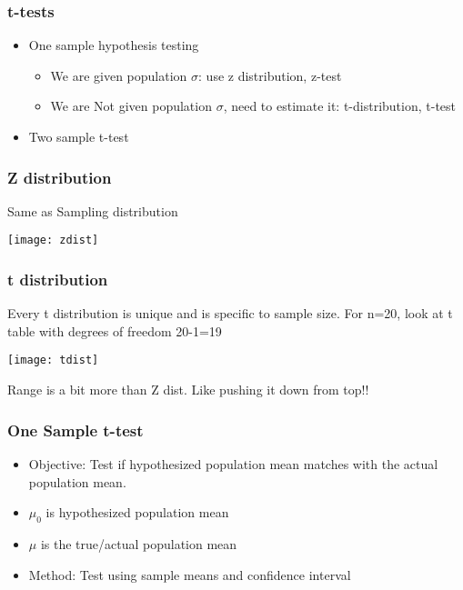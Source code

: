 \begin{frame}[fragile]\frametitle{t-tests}
\begin{itemize}
\item One sample hypothesis testing
\begin{itemize}
\item We are given population $\sigma$: use z distribution, z-test
\item We are Not given population $\sigma$, need to estimate it: t-distribution, t-test
\end{itemize}
\item Two sample t-test 
\end{itemize}
\end{frame}

\begin{frame}
\frametitle{Z distribution}
Same as Sampling distribution
\begin{center}
\texttt{[image: zdist]}
\end{center}
\end{frame}

\begin{frame}
\frametitle{t distribution}
Every t distribution is unique and is specific to sample size. For n=20, look at t table with degrees of freedom 20-1=19
\begin{center}
\texttt{[image: tdist]}
\end{center}
Range is a bit more than Z dist. Like pushing it down from top!!
\end{frame}

\begin{frame}[fragile]\frametitle{One Sample t-test}
\begin{itemize}
\item Objective: Test if hypothesized population mean matches with the actual population mean.
\item $\mu_0$ is hypothesized population mean
\item $\mu$ is the true/actual population mean
\item Method: Test using sample means and confidence interval
\end{itemize}
\end{frame}

